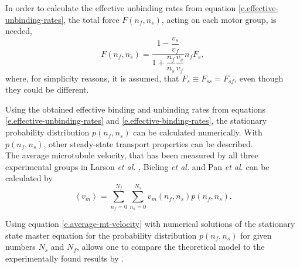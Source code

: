 In order to calculate the effective unbinding rates from equation \eqref{e.effective-unbinding-rates}, the total force $F\left(n_f, n_s\right)$, acting on each motor group, is needed,
\begin{equation}\label{e.total-force-on-motor-group}
 F\left(n_f, n_s\right) = \frac{1 - \dfrac{v_s}{v_f}}{1 + \dfrac{n_f}{n_s}\dfrac{v_s}{v_f}}n_fF_s,
\end{equation}
where, for simplicity reasons, it is assumed, that \mbox{$F_s \equiv F_{ss} = F_{sf}$}, even though they could be different.

Using the obtained effective binding and unbinding rates from equations \eqref{e.effective-unbinding-rates} and \eqref{e.effective-binding-rates}, the stationary probability distribution
$p\left(n_f, n_s\right)$ can be calculated numerically. With $p\left(n_f, n_s\right)$, other steady-state transport properties can be described.\\
The average microtubule velocity, that has been measured by all three experimental groups in Larson \textit{et al.} \cite{larson}, Bieling \textit{et al.} \cite{bieling} and Pan \textit{et al.}
\cite{jcb174} can be calculated by
\begin{equation}\label{e.average-mt-velocity}
 \left\langle v_m \right\rangle = \sum^{N_f}_{n_f = 0}\sum^{N_s}_{n_s = 0} v_m\left(n_f, n_s\right)p\left(n_f, n_s\right).
\end{equation}

Using equation \eqref{e.average-mt-velocity} with numerical solutions of the stationary state master equation for the probability distribution $p\left(n_f, n_s\right)$ for given numbers $N_s$ and
$N_f$, allows one to compare the theoretical model to the experimentally found results by \cite{larson, bieling, jcb174}.

